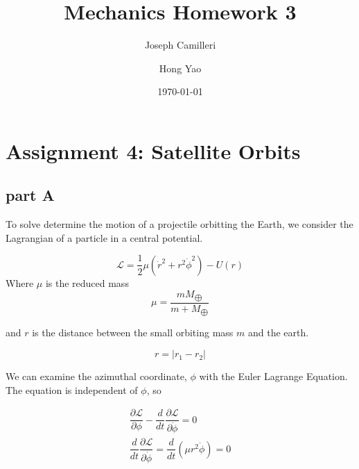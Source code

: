 \documentclass[%
 reprint,
 amsmath,amssymb,
 aps,
]{revtex4-1}
\begin{document}

\title{Mechanics Homework 3}%

\author{Joseph Camilleri}

\author{Hong Yao}
%


\date{\today}%

\maketitle

\section{Assignment 4: Satellite Orbits}
\subsection{part A}
To solve determine the motion of a projectile orbitting the Earth, we consider the Lagrangian of a particle in a central potential.


\begin{equation*}
\mathcal{L} = \dfrac{1}{2}\mu\left(\dot{r}^2 + r^2\dot{\phi}^2\right) - U(r)
\end{equation*}
Where $\mu$ is the reduced mass 
\begin{equation*}
\mu = \dfrac{mM_{\bigoplus}}{m + M_{\bigoplus}}
\end{equation*}

and $r$ is the distance between the small orbiting mass $m$
and the earth.

\begin{equation*}
r = \lvert r_1 - r_2 \rvert   
\end{equation*}

We can examine the azimuthal coordinate, $\phi$ with the Euler Lagrange Equation. The equation is independent of $\phi$, so

\begin{eqnarray*}
\dfrac{\partial\mathcal{L}}{\partial\phi} -  \dfrac{d}{d t}  \dfrac{\partial\mathcal{L}}{\partial\dot{\phi}} = 0 \\
\dfrac{d}{d t}\dfrac{\partial\mathcal{L}}{\partial\dot{\phi}} = \dfrac{d}{d t}\left(\mu r^2\dot{\phi}\right) = 0
\end{eqnarray*}
\end{document}
